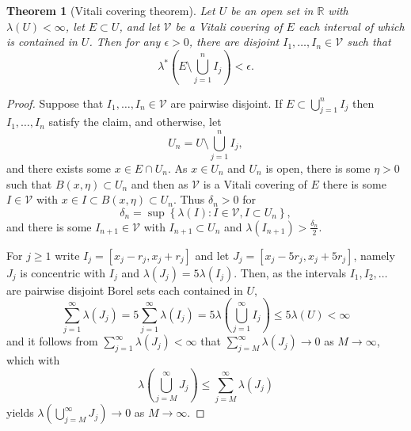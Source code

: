 \documentclass{article}
\newtheorem{theorem}{Theorem}
\theoremstyle{definition}
\begin{document}
\begin{theorem}[Vitali covering theorem]
Let $U$ be an open set in $\mathbb{R}$ with $\lambda(U)<\infty$, let $E \subset U$, and let $\mathcal{V}$ be a Vitali covering of $E$
each interval of which is contained in $U$. Then for any $\epsilon>0$, there are disjoint $I_1,\ldots,I_n \in \mathcal{V}$ such that
\[
\lambda^*\left(E \setminus \bigcup_{j=1}^n I_j \right)<\epsilon.
\]
\end{theorem}
\begin{proof}
Suppose that $I_1,\ldots,I_n \in \mathcal{V}$ are pairwise disjoint. If $E \subset \bigcup_{j=1}^n I_j$ then $I_1,\ldots,I_n$ satisfy the claim, and 
otherwise,
let 
\[
U_n = U \setminus \bigcup_{j=1}^n I_j,
\]
and there exists some $x \in E \cap U_n$. As $x \in U_n$ and $U_n$ is open, there is some $\eta>0$ such that $B(x,\eta) \subset U_n$ and then
as $\mathcal{V}$ is a Vitali covering of $E$ there is some $I \in \mathcal{V}$ with $x \in I \subset B(x,\eta) \subset U_n$. 
Thus $\delta_n>0$ for
\[
\delta_n = \sup\left\{ \lambda(I): I \in \mathcal{V}, I \subset U_n\right\},
\]
and there is some $I_{n+1} \in \mathcal{V}$ with $I_{n+1} \subset U_n$ and  $\lambda(I_{n+1}) > \frac{\delta_n}{2}$.

For $j \geq 1$ write  $I_j=[x_j-r_j,x_j+r_j]$ and let $J_j = [x_j-5r_j,x_j+5r_j]$, namely
$J_j$ is concentric with $I_j$ and $\lambda(J_j) = 5 \lambda(I_j)$. 
Then, as the intervals $I_1,I_2,\ldots$ are pairwise disjoint
Borel sets each contained in $U$,
\[
 \sum_{j=1}^\infty \lambda(J_j)
= 5 \sum_{j=1}^\infty \lambda(I_j)
= 5 \lambda\left( \bigcup_{j=1}^\infty I_j\right)
\leq 5 \lambda(U)
<\infty
\]
and it follows from $\sum_{j=1}^\infty \lambda(J_j)<\infty$  that $\sum_{j=M}^\infty \lambda(J_j) \to 0$ as $M \to \infty$,
which with
\[
\lambda\left(\bigcup_{j=M}^\infty J_j \right) \leq \sum_{j=M}^\infty \lambda(J_j)
\]
yields $\lambda\left( \bigcup_{j=M}^\infty J_j\right) \to 0$ as $M \to \infty$. 


\end{proof}
\end{document}
